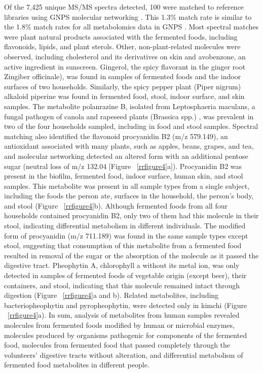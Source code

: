 Of the 7,425 unique MS/MS spectra detected, 100 were matched to reference libraries
using GNPS molecular networking \cite{Watrous2012,Yang2013}. This 1.3\% match rate
is similar to the 1.8\% match rates for all metabolomics data in GNPS \cite{DaSilva2015}.
Most spectral matches were plant natural products associated with the fermented foods,
including flavonoids, lipids, and plant sterols. Other, non-plant-related molecules
were observed, including cholesterol and its derivatives on skin and avobenzone, an
active ingredient in sunscreen. Gingerol, the spicy flavorant in the ginger root
Zingiber officinale), was found in samples of fermented foods and the indoor surfaces
of two households. Similarly, the spicy pepper plant (Piper nigrum) alkaloid piperine
was found in fermented food, stool, indoor surface, and skin samples. The metabolite
polanrazine B, isolated from Leptosphaeria maculans, a fungal pathogen of canola and
rapeseed plants (Brassica spp.) \cite{Sprague2007}, was prevalent in two of the
four households sampled, including in food and stool samples. Spectral matching
also identified the flavonoid procyanidin B2 (m/z 579.149), an antioxidant associated
with many plants, such as apples, beans, grapes, and tea, and molecular networking
detected an altered form with an additional pentose sugar (neutral loss of
m/z 132.04 \cite{Prasain2003} [Figure ~\ref{rrfigure4}a]). Procyanidin B2 was
present in the biofilm, fermented food, indoor surface, human skin, and stool samples.
This metabolite was present in all sample types from a single subject, including the
foods the person ate, surfaces in the household, the person’s body, and stool
(Figure ~\ref{rrfigure4}b). Although fermented foods from all four households
contained procyanidin B2, only two of them had this molecule in their stool,
indicating differential metabolism in different individuals. The modified form of
procyanidin (m/z 711.189) was found in the same sample types except stool, suggesting
that consumption of this metabolite from a fermented food resulted in removal of
the sugar or the absorption of the molecule as it passed the digestive tract.
Pheophytin A, chlorophyll a without its metal ion, was only detected in samples of
fermented foods of vegetable origin (except beer), their containers, and stool,
indicating that this molecule remained intact through digestion
(Figure ~\ref{rrfigure4}a and b). Related metabolites, including bacteriopheophytin
and pyropheophytin, were detected only in kimchi (Figure ~\ref{rrfigure4}a). In
sum, analysis of metabolites from human samples revealed molecules from fermented
foods modified by human or microbial enzymes, molecules produced by organisms pathogenic
for components of the fermented food, molecules from fermented food that passed
completely through the volunteers’ digestive tracts without alteration, and
differential metabolism of fermented food metabolites in different people.

